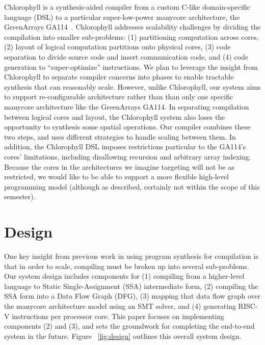\documentclass{sig-alternate-05-2015}
\begin{document}
Chlorophyll is a synthesis-aided compiler from a custom C-like domain-specific language (DSL) to a particular super-low-power manycore architecture, the GreenArrays GA114~\cite{chlorophyll}. Chlorophyll addresses scalability challenges by dividing the compilation into smaller sub-problems: (1) partitioning computation across cores, (2) layout of logical computation partitions onto physical cores, (3) code separation to divide source code and insert communication code, and (4) code generation to ``super-optimize'' instructions. We plan to leverage the insight from Chlorophyll to separate compiler concerns into phases to enable tractable synthesis that can reasonably scale. However, unlike Chlorophyll, our system aims to support re-configurable architecture rather than than only one specific manycore architecture like the GreenArrays GA114. In separating compilation between logical cores and layout, the Chlorophyll system also loses the opportunity to synthesis some spatial operations. Our compiler combines these two steps, and uses different strategies to handle scaling between them. In addition, the Chlorophyll DSL imposes restrictions particular to the GA114's cores' limitations, including disallowing recursion and arbitrary array indexing. Because the cores in the architectures we imagine targeting will not be as restricted, we would like to be able to support a more flexible high-level programming model (although as described, certainly not within the scope of this semester). 


\section{Design}
One key insight from previous work in using program synthesis for compilation is that in order to scale, compiling must be broken up into several sub-problems. Our system design includes components for (1) compiling from a higher-level language to Static Single-Assignment (SSA) intermediate form, (2) compiling the SSA form into a Data Flow Graph (DFG), (3) mapping that data flow graph over the manycore architecture model using an SMT solver, and (4) generating RISC-V instructions per processor core. This paper focuses on implementing components (2) and (3), and sets the groundwork for completing the end-to-end system in the future. Figure ~\ref{fig:design} outlines this overall system design. 
\end{document}
